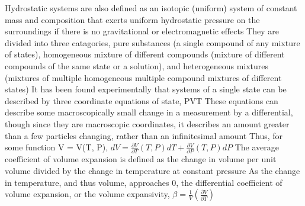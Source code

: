 \documentclass[11 pt, twoside]{article}
\newenvironment{outline*}
{
	\begin{outline}[enumerate]
	}
	{\end{outline}
}
\begin{document}
\begin{outline*}
\2 Hydrostatic systems are also defined as an isotopic (uniform) system of constant mass and composition that exerts uniform hydrostatic pressure on the surroundings if there is no gravitational or electromagnetic effects
\2 They are divided into three catagories, pure substances (a single compound of any mixture of states), homogeneous mixture of different compounds (mixture of different compounds of the same state or a solution), and heterogeneous mixtures (mixtures of multiple homogeneous multiple compound mixtures of different states)
\3 It has been found experimentally that systems of a single state can be described by three coordinate equations of state, PVT
\2 These equations can describe some macroscopically small change in a measurement by a differential, though since they are macroscopic coordinates, it describes an amount greater than a few particles changing, rather than an infinitesimal amount
\2 Thus, for some function V = V(T, P), $dV = \frac{\partial V}{\partial T}(T, P)dT + \frac{\partial V}{\partial P}(T, P)dP$
\3 The average coefficient of volume expansion is defined as the change in volume per unit volume divided by the change in temperature at constant pressure
\4 As the change in temperature, and thus volume, approaches 0, the differential coefficient of volume expansion, or the volume expansivity, $\beta = \frac{1}{V}(\frac{\partial V}{\partial T})$
\4 
\end{outline*}
\end{document}
